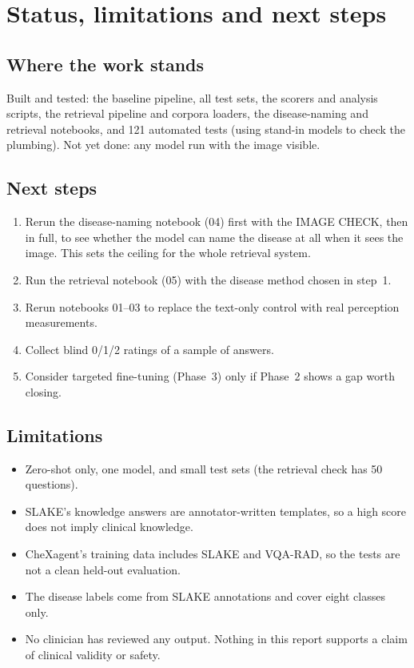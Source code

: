 \documentclass[11pt,a4paper]{article}
\begin{document}
\section{Status, limitations and next steps}
\subsection{Where the work stands}
Built and tested: the baseline pipeline, all test sets, the scorers and analysis scripts, the retrieval pipeline and corpora
loaders, the disease-naming and retrieval notebooks, and 121 automated tests (using stand-in models to check the plumbing).
Not yet done: any model run with the image visible.

\subsection{Next steps}
\begin{enumerate}
\item Rerun the disease-naming notebook (04) first with the IMAGE CHECK, then in full, to see whether the model can name the
disease at all when it sees the image. This sets the ceiling for the whole retrieval system.
\item Run the retrieval notebook (05) with the disease method chosen in step~1.
\item Rerun notebooks 01--03 to replace the text-only control with real perception measurements.
\item Collect blind 0/1/2 ratings of a sample of answers.
\item Consider targeted fine-tuning (Phase~3) only if Phase~2 shows a gap worth closing.
\end{enumerate}

\subsection{Limitations}
\begin{itemize}
\item Zero-shot only, one model, and small test sets (the retrieval check has 50 questions).
\item SLAKE's knowledge answers are annotator-written templates, so a high score does not imply clinical knowledge.
\item CheXagent's training data includes SLAKE and VQA-RAD, so the tests are not a clean held-out evaluation.
\item The disease labels come from SLAKE annotations and cover eight classes only.
\item No clinician has reviewed any output. Nothing in this report supports a claim of clinical validity or safety.
\end{itemize}
\end{document}
